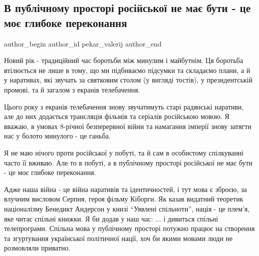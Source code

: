  
 
 
 
 
 
\subsection{В публічному просторі російської не має бути - це моє глибоке переконання}
\label{sec:30_12_2021.fb.pekar_valerij.1.mova_jazyk_public}
 
\ifcmt
 author_begin
   author_id pekar_valerij
 author_end
\fi

Новий рік - традиційний час боротьби між минулим і майбутнім. Ця боротьба
втілюється не лише в тому, що ми підбиваємо підсумки та складаємо плани, а й у
наративах, які звучать за святковим столом (у вигляді тостів), у президентській
промові, та й загалом з екранів телебачення.


Цього року з екранів телебачення знову звучатимуть старі радянські наративи,
але до них додається трансляція фільмів та серіалів російською мовою. Я вважаю,
в умовах 8-річної безперервної війни та намагання імперії знову затягти нас у
болото минулого - це ганьба.

Я не маю нічого проти російської у побуті, та й сам в особистому спілкуванні
часто її вживаю. Але то в побуті, а в публічному просторі російської не має
бути - це моє глибоке переконання.

Адже наша війна - це війна наративів та ідентичностей, і тут мова є зброєю, за
влучним висловом Серпня, героя фільму Кіборги. Як казав видатний теоретик
націоналізму Бенедикт Андерсон у книзі \enquote{Уявлені спільноти}, нація - це плем'я,
яке читає спільні книжки. Я би додав у наш час: ... і дивиться спільні
телепрограми. Спільна мова у публічному просторі потужно працює на створення та
згуртування української політичної нації, хоч би якими мовами люди не
розмовляли приватно.

